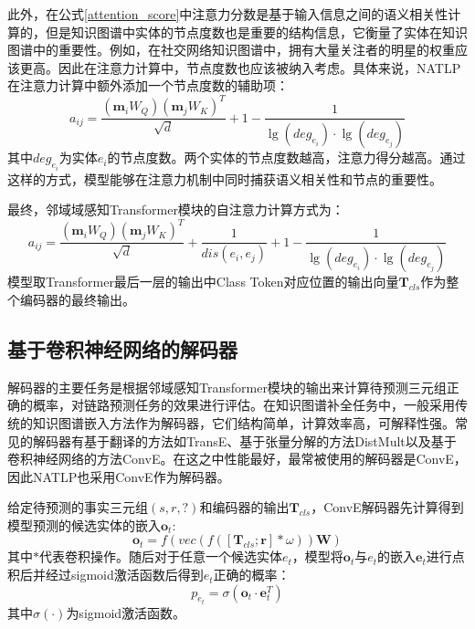 此外，在公式\ref{attention_score}中注意力分数是基于输入信息之间的语义相关性计算的，但是知识图谱中实体的节点度数也是重要的结构信息，它衡量了实体在知识图谱中的重要性。例如，在社交网络知识图谱中，拥有大量关注者的明星的权重应该更高。因此在注意力计算中，节点度数也应该被纳入考虑。具体来说，NATLP在注意力计算中额外添加一个节点度数的辅助项：
\begin{equation}
  a_{ij}=\frac{(\boldsymbol{m}_iW_Q)(\boldsymbol{m}_jW_K)^T}{\sqrt{d}}+1-\frac{1}{\lg (deg_{e_i})\cdot \lg (deg_{e_j})}
\end{equation}
其中$deg_{e_i}$为实体$e_i$的节点度数。两个实体的节点度数越高，注意力得分越高。通过这样的方式，模型能够在注意力机制中同时捕获语义相关性和节点的重要性。

最终，邻域域感知Transformer模块的自注意力计算方式为：
\begin{equation}
  a_{ij}=\frac{(\boldsymbol{m}_iW_Q)(\boldsymbol{m}_jW_K)^T}{\sqrt{d}}+\frac{1}{dis(e_i,e_j)}+1-\frac{1}{\lg (deg_{e_i})\cdot \lg (deg_{e_j})}
\end{equation}
模型取Transformer最后一层的输出中Class Token对应位置的输出向量$\boldsymbol{T}_{cls}$作为整个编码器的最终输出。


\subsection{基于卷积神经网络的解码器}

解码器的主要任务是根据邻域感知Transformer模块的输出来计算待预测三元组正确的概率，对链路预测任务的效果进行评估。在知识图谱补全任务中，一般采用传统的知识图谱嵌入方法作为解码器，它们结构简单，计算效率高，可解释性强。常见的解码器有基于翻译的方法如TransE、基于张量分解的方法DistMult以及基于卷积神经网络的方法ConvE。在这之中性能最好，最常被使用的解码器是ConvE，因此NATLP也采用ConvE作为解码器。

给定待预测的事实三元组$(s,r,?)$和编码器的输出$\boldsymbol{T}_{cls}$，ConvE解码器先计算得到模型预测的候选实体的嵌入$\boldsymbol{o}_{t}$:
\begin{equation}
  \boldsymbol{o}_{t}=f\left(vec\left(f\left(\left[\boldsymbol{T}_{cls};\boldsymbol{r}\right]\ast \omega\right)\right)\mathbf{W}\right)
\end{equation}
其中$\ast$代表卷积操作。随后对于任意一个候选实体$e_t$，模型将$\boldsymbol{o}_{t}$与$e_t$的嵌入$\boldsymbol{e}_{t}$进行点积后并经过sigmoid激活函数后得到$e_t$正确的概率：
\begin{equation}
  p_{e_t} = \sigma(\boldsymbol{o}_{t}\cdot \boldsymbol{e}_{t}^T)
\end{equation}
其中$\sigma(\cdot)$为sigmoid激活函数。

